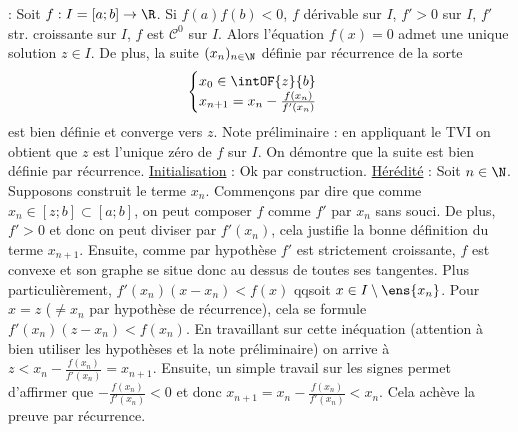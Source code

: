 \markdownRendererDocumentBegin
{}\markdownRendererInterblockSeparator
{}\shortcutProposition{} : Soit $f:I = [a;b] \to \R$. Si\markdownRendererInterblockSeparator
{}\markdownRendererUlBeginTight
\markdownRendererUlItem $f(a)f(b) <0$,\markdownRendererUlItemEnd 
\markdownRendererUlItem $f$ dérivable sur $I$,\markdownRendererUlItemEnd 
\markdownRendererUlItem $f'>0$ sur $I$,\markdownRendererUlItemEnd 
\markdownRendererUlItem $f'$ str. croissante sur $I$,\markdownRendererUlItemEnd 
\markdownRendererUlItem $f$ est $\mathscr C^0$ sur $I$.\markdownRendererUlItemEnd 
\markdownRendererUlEndTight \markdownRendererInterblockSeparator
{}Alors l'équation $f(x)=0$ admet une unique solution $z \in I$. De plus, la suite $(x_n)_{n \in \N}$ définie par récurrence de la sorte\markdownRendererInterblockSeparator
{}$$ \begin{cases} x_0 \in \intOF{z}{b} \\ x_{n+1} = x_n - \frac{f(x_n)}{f'(x_n)} \end{cases} $$\markdownRendererInterblockSeparator
{}est bien définie et converge vers $z$.\markdownRendererInterblockSeparator
{}\markdownRendererInterblockSeparator
{}Note préliminaire : en appliquant le TVI on obtient que $z$ est l'unique zéro de $f$ sur $I$.\markdownRendererInterblockSeparator
{}On démontre que la suite est bien définie par récurrence.\markdownRendererInterblockSeparator
{}\underline{Initialisation} : Ok par construction.\markdownRendererInterblockSeparator
{}\underline{Hérédité} : Soit $n \in \N$. Supposons construit le terme $x_n$. Commençons par dire que comme $x_n \in [z;b] \subset [a;b]$, on peut composer $f$ comme $f'$ par $x_n$ sans souci. De plus, $f' > 0$ et donc on peut diviser par $f'(x_n)$, cela justifie la bonne définition du terme $x_{n+1}$.\markdownRendererInterblockSeparator
{}Ensuite, comme par hypothèse $f'$ est strictement croissante, $f$ est convexe et son graphe se situe donc au dessus de toutes ses tangentes. Plus particulièrement, $f'(x_n)(x-x_n) < f(x)$ qqsoit $x \in I \setminus \ens{x_n}$. Pour $x=z$ ($\neq x_n$ par hypothèse de récurrence), cela se formule $f'(x_n)(z-x_n) < f(x_n)$. En travaillant sur cette inéquation (attention à bien utiliser les hypothèses et la note préliminaire) on arrive à $z < x_n - \frac{f(x_n)}{f'(x_n)} = x_{n+1}$.\markdownRendererInterblockSeparator
{}Ensuite, un simple travail sur les signes permet d'affirmer que $-\frac{f(x_n)}{f'(x_n)} < 0$ et donc $x_{n+1} = x_n-\frac{f(x_n)}{f'(x_n)} < x_n$. Cela achève la preuve par récurrence.\markdownRendererInterblockSeparator
